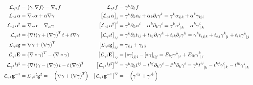 \documentclass[a4paper,7pt]{scrartcl}
\newcommand{\lie}{\mathcal{L}}
\newcommand{\gb}{\mathbf{g}}
\newcommand{\Eb}{\mathbf{E}}
\begin{document}
\begin{align*}
  \lie_{\gamma^{\sharp}} f &= \left\langle \gamma , \nabla f \right\rangle = \nabla_{\gamma}f
         &\lie_{\gamma^{\sharp}}f &= \gamma^{k}\partial_{k}f \\
  \lie_{\gamma^{\sharp}} \alpha &= \nabla_{\gamma}\alpha + \alpha\nabla\gamma 
        &\left[ \lie_{\gamma^{\sharp}} \alpha \right]_{i} &= \gamma^{k}\partial_{k}\alpha_{i} + \alpha_{k}\partial_{i}\gamma^{k}
                          = \gamma^{k}\alpha_{i|k} + \alpha^{k}\gamma_{k|i}\\
  \lie_{\gamma^{\sharp}} \alpha^{\sharp} &= \nabla_{\gamma}\alpha - \nabla_{\alpha}\gamma
        &\left[ \lie_{\gamma^{\sharp}} \alpha^{\sharp} \right]^{i} &= \gamma^{k}\partial_{k}\alpha^{i} - \alpha^{k}\partial_{k}\gamma^{i}
                          =\gamma^{k}\tensor{\alpha}{^{i}_{|k}} - \alpha^{k}\tensor{\gamma}{^{i}_{|k}}\\
  \lie_{\gamma^{\sharp}}t &= (\nabla t)\gamma + \left( \nabla\gamma \right)^{T}t + t\nabla\gamma
        &\left[ \lie_{\gamma^{\sharp}}t \right]_{ij} &= \gamma^{k}\partial_{k}t_{ij} + t_{kj}\partial_{i}\gamma^{k} + t_{ik}\partial_{j}\gamma^{k}
              = \gamma^{k}t_{ij|k} + t_{kj}\tensor{\gamma}{^{k}_{|i}} +  t_{ik}\tensor{\gamma}{^{k}_{|j}}\\
  \lie_{\gamma^{\sharp}}\gb &= \nabla\gamma + \left( \nabla\gamma \right)^{T}
        &\left[ \lie_{\gamma^{\sharp}}\gb \right]_{ij} &= \gamma_{i|j} + \gamma_{j|i}\\
  \lie_{\gamma^{\sharp}}\Eb &= \left( \nabla*\gamma \right)^{T} - \left( \nabla*\gamma \right)
        &\left[ \lie_{\gamma^{\sharp}}\Eb \right]_{ij} &= \left[ *\gamma \right]_{j|i} - \left[ *\gamma \right]_{i|j}
              = E_{kj}\tensor{\gamma}{^{k}_{|i}} + E_{ik}\tensor{\gamma}{^{k}_{|j}} \\
  \lie_{\gamma^{\sharp}}\tensor[^{\sharp}]{t}{^{\sharp}} &= (\nabla t)\gamma - \left( \nabla\gamma \right)t - t\left( \nabla\gamma \right)^{T}
        &\left[ \lie_{\gamma^{\sharp}}\tensor[^{\sharp}]{t}{^{\sharp}} \right]^{ij}
            &= \gamma^{k}\partial_{k}t^{ij} - t^{kj}\partial_{k}\gamma^{i} - t^{ik}\partial_{k}\gamma^{i}
             = \gamma^{k}\tensor{t}{^{ij}_{|k}} - t^{kj}\tensor{\gamma}{^{i}_{|k}} - t^{ik}\tensor{\gamma}{^{j}_{|k}}\\
  \lie_{\gamma^{\sharp}}\gb^{-1} &= \lie_{\gamma^{\sharp}}\tensor[^{\sharp}]{\gb}{^{\sharp}} = -\left(\nabla\gamma + \left( \nabla\gamma \right)^{T}\right)
        &\left[ \lie_{\gamma^{\sharp}}\gb^{-1} \right]^{ij} &= -\left(\gamma^{i|j} + \gamma^{j|i}\right)\\

\end{align*}
\end{document}
